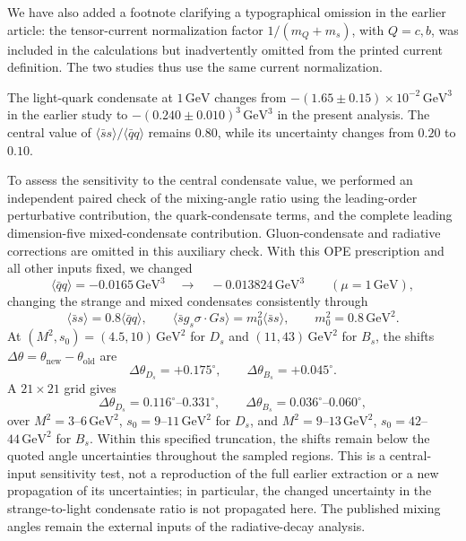 We have also added a footnote clarifying a typographical omission in
the earlier article: the tensor-current normalization factor
$1/(m_Q+m_s)$, with $Q=c,b$, was included in the calculations but
inadvertently omitted from the printed current definition. The two
studies thus use the same current normalization.

The light-quark condensate at $1\,\mathrm{GeV}$ changes from
$-(1.65\pm0.15)\times10^{-2}\,\mathrm{GeV}^3$ in the earlier study
to $-(0.240\pm0.010)^3\,\mathrm{GeV}^3$ in the present analysis.
The central value of $\langle\bar ss\rangle/\langle\bar qq\rangle$
remains $0.80$, while its uncertainty changes from $0.20$ to $0.10$.

To assess the sensitivity to the central condensate value, we performed
an independent paired check of the mixing-angle ratio using the
leading-order perturbative contribution, the quark-condensate terms,
and the complete leading dimension-five mixed-condensate contribution.
Gluon-condensate and radiative corrections are omitted in this
auxiliary check. With this OPE prescription and all other inputs fixed,
we changed
\begin{equation}
\langle\bar qq\rangle=-0.0165\,\mathrm{GeV}^3
\quad\longrightarrow\quad
-0.013824\,\mathrm{GeV}^3
\qquad (\mu=1\,\mathrm{GeV}),
\end{equation}
changing the strange and mixed condensates consistently through
\begin{equation}
\langle\bar ss\rangle=0.8\langle\bar qq\rangle,
\qquad
\langle\bar s g_s\sigma\!\cdot\!G s\rangle
=m_0^2\langle\bar ss\rangle,
\qquad m_0^2=0.8\,\mathrm{GeV}^2.
\end{equation}
At $(M^2,s_0)=(4.5,10)\,\mathrm{GeV}^2$ for $D_s$ and
$(11,43)\,\mathrm{GeV}^2$ for $B_s$, the shifts
$\Delta\theta=\theta_{\mathrm{new}}-\theta_{\mathrm{old}}$ are
\begin{equation}
\Delta\theta_{D_s}=+0.175^\circ,
\qquad
\Delta\theta_{B_s}=+0.045^\circ.
\end{equation}
A $21\times21$ grid gives
\begin{equation}
\Delta\theta_{D_s}=0.116^\circ\text{--}0.331^\circ,
\qquad
\Delta\theta_{B_s}=0.036^\circ\text{--}0.060^\circ,
\end{equation}
over $M^2=3$--$6\,\mathrm{GeV}^2$, $s_0=9$--$11\,\mathrm{GeV}^2$
for $D_s$, and $M^2=9$--$13\,\mathrm{GeV}^2$,
$s_0=42$--$44\,\mathrm{GeV}^2$ for $B_s$.
Within this specified truncation, the shifts remain below the quoted
angle uncertainties throughout the sampled regions. This is a
central-input sensitivity test, not a reproduction of the full earlier
extraction or a new propagation of its uncertainties; in particular,
the changed uncertainty in the strange-to-light condensate ratio is
not propagated here. The published mixing angles remain the external
inputs of the radiative-decay analysis.

